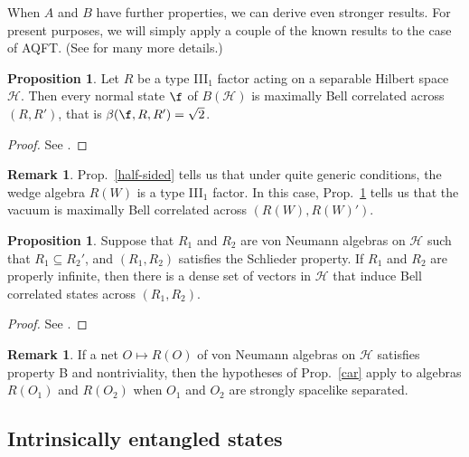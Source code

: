 \documentclass[12pt]{article}
\theoremstyle{definition}
\newtheorem{prop}[thm]{Proposition}
\theoremstyle{definition}
\newtheorem{note}[thm]{Remark}
\theoremstyle{remark}
\def\2#1{{\mathcal #1}}
\begin{document}
When $A$ and $B$ have further properties, we can derive even stronger
results.  For present purposes, we will simply apply a couple of the
known results to the case of AQFT.  (See \cite{sum} for many more
details.)

\begin{prop} Let $R$ be a type III$_1$ factor acting on a separable
  Hilbert space $\2H$.  Then every normal state $\f$ of $B(\2H )$ is
  maximally Bell correlated across $(R,R')$, that is $\beta (\f
  ,R,R')=\sqrt{2}$. \label{max}
\end{prop}

\begin{proof} See \cite{sumwe2,sumwe}. \end{proof}

\begin{note} Prop.\ \ref{half-sided} tells us that under quite generic
  conditions, the wedge algebra $R(W)$ is a type III$_1$ factor.
  In this case, Prop.\ \ref{max} tells us that the vacuum is maximally
  Bell correlated across $(R(W),R(W)')$.  \end{note}

\begin{prop} Suppose that $R_1$ and $R_2$ are von Neumann algebras on
  $\2H$ such that $R_1\subseteq R_2'$, and $(R_1,R_2)$ satisfies the
  Schlieder property.  If $R_1$ and $R_2$ are properly infinite, then
  there is a dense set of vectors in $\2H$ that induce Bell correlated
  states across $(R_1,R_2 )$.  \label{genbell} \label{car} \end{prop}

\begin{proof} See \cite{gbell}. \end{proof}


\begin{note} If a net $O\mapsto R(O)$ of von Neumann algebras on $\2H$
  satisfies property B and nontriviality, then the hypotheses of
  Prop.\ \ref{car} apply to algebras $R(O_1)$ and $R(O_2)$ when $O_1$
  and $O_2$ are strongly spacelike separated.  \end{note}

\bigskip {}


\subsection{Intrinsically entangled states} \label{open}
\end{document}
